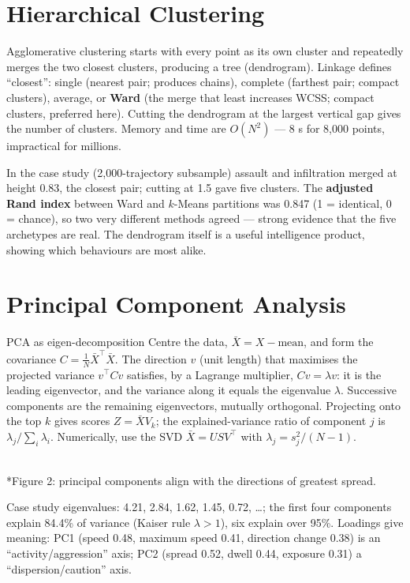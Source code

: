 \documentclass[11pt]{article}
\begin{document}
\section{Hierarchical Clustering}
Agglomerative clustering starts with every point as its own cluster and repeatedly merges the two closest clusters, producing a tree (dendrogram). Linkage defines ``closest'': single (nearest pair; produces chains), complete (farthest pair; compact clusters), average, or \textbf{Ward} (the merge that least increases WCSS; compact clusters, preferred here). Cutting the dendrogram at the largest vertical gap gives the number of clusters. Memory and time are $O(N^2)$ --- 8 s for 8,000 points, impractical for millions.

In the case study (2,000-trajectory subsample) assault and infiltration merged at height 0.83, the closest pair; cutting at 1.5 gave five clusters. The \textbf{adjusted Rand index} between Ward and $k$-Means partitions was 0.847 (1 = identical, 0 = chance), so two very different methods agreed --- strong evidence that the five archetypes are real. The dendrogram itself is a useful intelligence product, showing which behaviours are most alike.

\section{Principal Component Analysis}
\begin{derivation}{PCA as eigen-decomposition}
Centre the data, $\bar X=X-\text{mean}$, and form the covariance $C=\frac1N\bar X^\top\bar X$. The direction $v$ (unit length) that maximises the projected variance $v^\top Cv$ satisfies, by a Lagrange multiplier, $Cv=\lambda v$: it is the leading eigenvector, and the variance along it equals the eigenvalue $\lambda$. Successive components are the remaining eigenvectors, mutually orthogonal. Projecting onto the top $k$ gives scores $Z=\bar XV_k$; the explained-variance ratio of component $j$ is $\lambda_j/\sum_i\lambda_i$. Numerically, use the SVD $\bar X=USV^\top$ with $\lambda_j=s_j^2/(N-1)$.
\end{derivation}
\begin{center}\\*{\small\color{GreyN}Figure 2: principal components align with the directions of greatest spread.}\end{center}
Case study eigenvalues: 4.21, 2.84, 1.62, 1.45, 0.72, \ldots; the first four components explain 84.4\% of variance (Kaiser rule $\lambda>1$), six explain over 95\%. Loadings give meaning: PC1 (speed 0.48, maximum speed 0.41, direction change 0.38) is an ``activity/aggression'' axis; PC2 (spread 0.52, dwell 0.44, exposure 0.31) a ``dispersion/caution'' axis.
\end{document}
